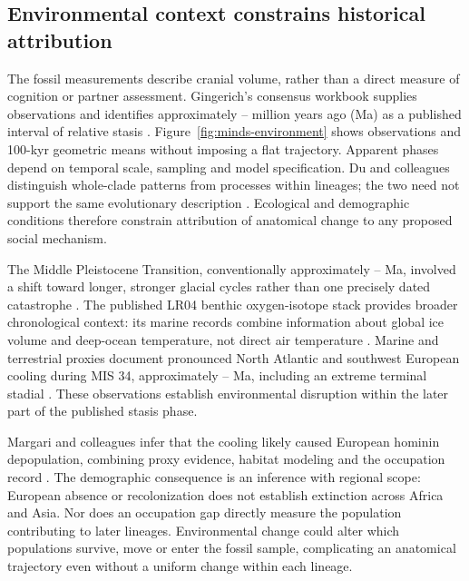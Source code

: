 \subsection{Environmental context constrains historical attribution}

The fossil measurements describe cranial volume, rather than a direct measure of cognition or partner assessment. Gingerich's consensus workbook supplies \MwcFossilN{} observations and identifies approximately \MwcStasisOlder--\MwcStasisYounger{} million years ago (Ma) as a published interval of relative stasis \citep{gingerich2022}. Figure~\ref{fig:minds-environment} shows observations and 100-kyr geometric means without imposing a flat trajectory. Apparent phases depend on temporal scale, sampling and model specification. Du and colleagues distinguish whole-clade patterns from processes within lineages; the two need not support the same evolutionary description \citep{du2018}. Ecological and demographic conditions therefore constrain attribution of anatomical change to any proposed social mechanism.

The Middle Pleistocene Transition, conventionally approximately \MwcMptOlder--\MwcMptYounger{} Ma, involved a shift toward longer, stronger glacial cycles rather than one precisely dated catastrophe \citep{clark2006}. The published LR04 benthic oxygen-isotope stack provides broader chronological context: its \MwcClimateRecords{} marine records combine information about global ice volume and deep-ocean temperature, not direct air temperature \citep{lisiecki2005}. Marine and terrestrial proxies document pronounced North Atlantic and southwest European cooling during MIS 34, approximately \MwcMisOlder--\MwcMisYounger{} Ma, including an extreme terminal stadial \citep{margari2023}. These observations establish environmental disruption within the later part of the published stasis phase.

Margari and colleagues infer that the cooling likely caused European hominin depopulation, combining proxy evidence, habitat modeling and the occupation record \citep{margari2023}. The demographic consequence is an inference with regional scope: European absence or recolonization does not establish extinction across Africa and Asia. Nor does an occupation gap directly measure the population contributing to later lineages. Environmental change could alter which populations survive, move or enter the fossil sample, complicating an anatomical trajectory even without a uniform change within each lineage.

